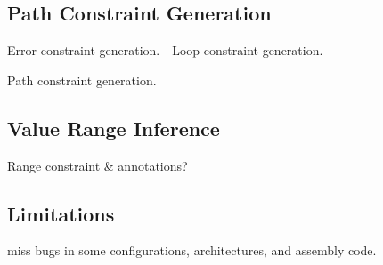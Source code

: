 \subsection{Path Constraint Generation}

Error constraint generation.
- Loop constraint generation.

Path constraint generation.

\subsection{Value Range Inference}

Range constraint \& annotations?

\subsection{Limitations}

miss bugs in some configurations, architectures,
and assembly code.
